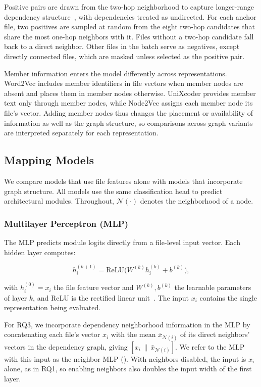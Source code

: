Positive pairs are drawn from the two-hop neighborhood to capture longer-range dependency structure~\cite{structsar}, with dependencies treated as undirected. For each anchor file, two positives are sampled at random from the eight two-hop candidates that share the most one-hop neighbors with it. Files without a two-hop candidate fall back to a direct neighbor. Other files in the batch serve as negatives, except directly connected files, which are masked unless selected as the positive pair.

Member information enters the model differently across representations. Word2Vec includes member identifiers in file vectors when member nodes are absent and places them in member nodes otherwise. UniXcoder provides member text only through member nodes, while Node2Vec assigns each member node its file's vector. Adding member nodes thus changes the placement or availability of information as well as the graph structure, so comparisons across graph variants are interpreted separately for each representation.

\subsection{Mapping Models\label{sec:mapping_models}}

We compare models that use file features alone with models that incorporate graph structure. All models use the same classification head to predict architectural modules. Throughout, $\mathcal{N}(\cdot)$ denotes the neighborhood of a node.

\subsubsection{Multilayer Perceptron (MLP)\label{sec:mlp}}

The MLP predicts module logits directly from a file-level input vector. Each hidden layer computes:

\begin{equation}
h_i^{(k+1)} = \text{ReLU}\big(W^{(k)} h_i^{(k)} + b^{(k)}\big),
\end{equation}

with $h_i^{(0)} = x_i$ the file feature vector and $W^{(k)}, b^{(k)}$ the learnable parameters of layer $k$, and ReLU is the rectified linear unit~\cite{relu}. The input $x_i$ contains the single representation being evaluated.

For RQ3, we incorporate dependency neighborhood information in the MLP by concatenating each file's vector $x_i$ with the mean $\bar{x}_{\mathcal{N}(i)}$ of its direct neighbors' vectors in the dependency graph, giving $[x_i \,\|\, \bar{x}_{\mathcal{N}(i)}]$. We refer to the MLP with this input as the neighbor MLP (\mlp{}). With neighbors disabled, the input is $x_i$ alone, as in RQ1, so enabling neighbors also doubles the input width of the first layer.

